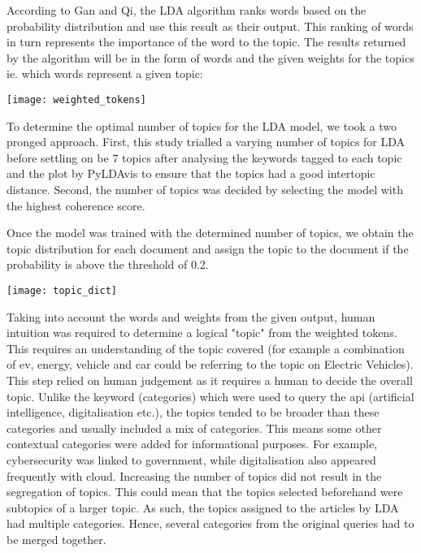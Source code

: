 \documentclass{article}
\begin{document}
\begin{titlepage}
\begin{itemize}
      		\quad According to Gan and Qi, the LDA algorithm ranks words based on the probability distribution and use this result as their output. This ranking of words in turn represents the importance of the word to the topic. The results returned by the algorithm will be in the form of words and the given weights for the topics ie. which words represent a given topic:
	
\begin{center}
\texttt{[image: weighted\_tokens]}
\end{center}
 
 
 			\quad To determine the optimal number of topics for the LDA model, we took a two pronged approach. First, this study trialled a varying number of topics for LDA before settling on be 7 topics after analysing the keywords tagged to each topic and the plot by PyLDAvis to ensure that the topics had a good intertopic distance. Second, the number of topics was decided by selecting the model with the highest coherence score. 
 			
 				
			\quad Once the model was trained with the determined number of topics, we obtain the topic distribution for each document and assign the topic to the document if the probability is above the threshold of 0.2. 
 			
 \begin{center}
\texttt{[image: topic\_dict]}
\end{center}
 			
 			
 			
			\quad Taking into account the words and weights from the given output, human intuition was required to determine a logical "topic" from the weighted tokens. This requires an understanding of the topic covered (for example a combination of ev, energy, vehicle and car could be referring to the topic on Electric Vehicles).  This step relied on human judgement as it requires a human to decide the overall topic. Unlike the keyword (categories) which were used to query the api (artificial intelligence, digitalisation etc.), the topics tended to be broader than these categories and usually included a mix of categories. This means some other contextual categories were added for informational purposes. For example, cybersecurity was linked to government, while digitalisation also appeared frequently with cloud. Increasing the number of topics did not result in the segregation of topics. This could mean that the topics selected beforehand were subtopics of a larger topic. As such, the topics assigned to the articles by LDA had multiple categories. Hence, several categories from the original queries had to be merged together. 
			

\end{itemize}
\end{titlepage}
\end{document}

